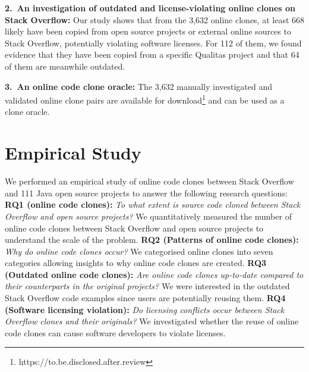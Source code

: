 \documentclass[sigconf,review, anonymous]{acmart}
\begin{document}
\vspace{0.5ex}%
\noindent\textbf{2.~An investigation of outdated and license-violating
  online clones on Stack Overflow:} Our study shows that from the
3,632 online clones, at least 668 likely have been copied from open
source projects or external online sources to Stack Overflow,
potentially violating software licenses. For 112 of them, we found
evidence that they have been copied from a specific Qualitas project
and that 64 of them are meanwhile outdated.

\vspace{0.5ex}%
\noindent\textbf{3.~An online code clone oracle:} The 3,632 manually
investigated and validated online clone pairs are available for
download\footnote{https://to.be.disclosed.after.review} and can be
used as a clone oracle.

\section{Empirical Study}

We performed an empirical study of online code clones between Stack
Overflow and 111 Java open source projects to answer the following
research questions: \\
%
\textbf{RQ1 (online code clones):} \textit{To what extent is source
  code cloned between Stack Overflow and open source projects?} We
quantitatively measured the number of online code clones between Stack
Overflow and open source projects to understand the scale of the
problem. \newline 
%
\textbf{RQ2 (Patterns of online code clones):} \textit{Why do online
  code clones occur?} We categorised online clones into seven
categories allowing insights to why online code clones are created.
\newline
%
\textbf{RQ3 (Outdated online code clones):} \textit{Are
  online code clones up-to-date compared to their counterparts in the
  original projects?} We were interested in the outdated Stack
Overflow code examples since users are potentially reusing
them. \newline
%
\textbf{RQ4 (Software licensing violation):} \textit{Do
  licensing conflicts occur between Stack Overflow clones and their
  originals?} We investigated whether the reuse of online code clones
can cause software developers to violate licenses.
\end{document}
